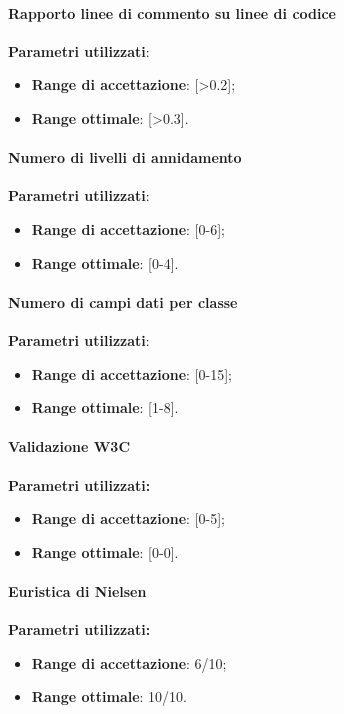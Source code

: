 \documentclass[12pt,a4paper,titlepage]{article}
\begin{document}
			\paragraph{Rapporto linee di commento su linee di codice}
			\textbf{Parametri utilizzati}:
			\begin{itemize}
				\item \textbf{Range di accettazione}: [>0.2];
				\item \textbf{Range ottimale}: [>0.3].
			\end{itemize}
		
			\paragraph{Numero di livelli di annidamento}
			\textbf{Parametri utilizzati}:
			\begin{itemize}
				\item \textbf{Range di accettazione}: [0-6];
				\item \textbf{Range ottimale}: [0-4].
			\end{itemize}
		
			\paragraph{Numero di campi dati per classe}
			\textbf{Parametri utilizzati}:
			\begin{itemize}
				\item \textbf{Range di accettazione}: [0-15];
				\item \textbf{Range ottimale}: [1-8].
			\end{itemize}
		
			\paragraph{Validazione W3C}
			\textbf{Parametri utilizzati:}
			\begin{itemize}
				\item \textbf{Range di accettazione}: [0-5];
				\item \textbf{Range ottimale}: [0-0].
			\end{itemize}
			
			\paragraph{Euristica di Nielsen}
			\textbf{Parametri utilizzati:}
			\begin{itemize}
				\item \textbf{Range di accettazione}: 6/10;
				\item \textbf{Range ottimale}: 10/10.
			\end{itemize}
			
\end{document}
